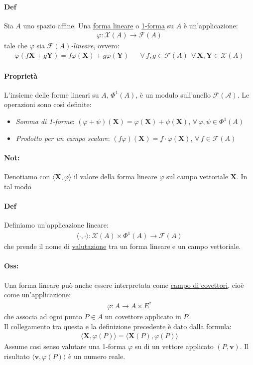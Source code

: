 \documentclass[10pt,a4paper]{book}
\begin{document}
\paragraph{Def} Sia $A$ uno spazio affine. Una \underline{forma lineare} o \underline{1-forma} su $A$ è un'applicazione:
\begin{align*}
    \varphi \colon \mathcal{X}(A)\to \mathcal{F}(A)
\end{align*}
tale che $\varphi$ sia \textit{$\mathcal{F}(A)$-lineare}, ovvero:
\begin{align*}
    \varphi(f\mathbf{X}+g\mathbf{Y})=f\varphi(\mathbf{X})+g\varphi(\mathbf{Y})&& \forall\, f,g\in \mathcal{F}(A)\:\:\forall \, \mathbf{X},\mathbf{Y}\in \mathcal{X}(A)
\end{align*}
\paragraph{Proprietà}L'insieme delle forme lineari su $A$, $\Phi^1(A)$, è un modulo sull'anello $\mathcal{F(A)}$. Le operazioni sono così definite:
\begin{itemize}
    \item \textit{Somma di 1-forme}: $(\varphi+ \psi)(\mathbf{X})=\varphi(\mathbf{X})+\psi(\mathbf{X})$, $\forall\, \varphi, \psi\in \Phi^1(A)$
    \item \textit{Prodotto per un campo scalare}: $(f\varphi)(\mathbf{X})=f\cdot \varphi(\mathbf{X})$, $\forall\, f \in \mathcal{F}(A)$
\end{itemize}
\paragraph{Not:} Denotiamo con $\langle \mathbf{X},\varphi\rangle $ il valore della forma lineare $\varphi$ sul campo vettoriale $\mathbf{X}$. In tal modo
\paragraph{Def} Definiamo un'applicazione lineare:
\begin{align*}
    \langle \cdot,\cdot\rangle  \colon \mathcal{X}(A)\times \Phi^1(A)\to \mathcal{F}(A)
\end{align*}
che prende il nome di \underline{valutazione} tra un forma lineare e un campo vettoriale.
\paragraph{Oss:} Una forma lineare può anche essere interpretata come \underline{campo di covettori}, cioè come un'applicazione:
\begin{align*}
    \varphi \colon A \to A \times E^*
\end{align*}
che associa ad ogni punto $P\in A$ un covettore applicato in $P$.\\
Il collegamento tra questa e la definizione precedente è dato dalla formula:
\begin{align*}
    \langle \mathbf{X},\varphi(P)\rangle =\langle \mathbf{X}(P),\varphi(P)\rangle 
\end{align*} 
Assume cosi senso valutare una 1-forma $\varphi$ su di un vettore applicato $(P,\mathbf{v})$. Il risultato $\langle \mathbf{v},\varphi(P)\rangle $ è un numero reale.
\end{document}
